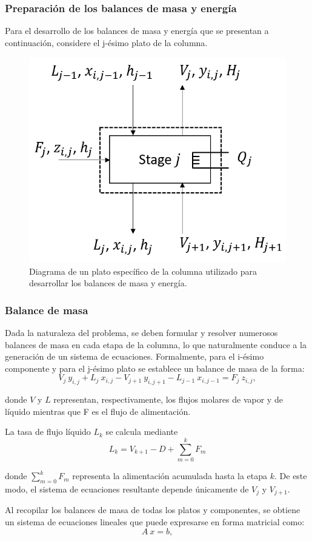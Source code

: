 \newpage
\subsubsection{Preparación de los balances de masa y energía}
Para el desarrollo de los balances de masa y energía que se presentan a continuación, considere el j-ésimo plato de la columna.

\begin{figure}[ht]
    \centering
    \includegraphics[width=0.5\linewidth]{../resources/flowcharts/balances_plato.png}
    \caption{Diagrama de un plato específico de la columna utilizado para desarrollar los balances de masa y energía.}
\end{figure}

\subsubsection{Balance de masa}
Dada la naturaleza del problema, se deben formular y resolver numerosos balances de masa en cada etapa de la columna, lo que naturalmente conduce a la generación de un sistema de ecuaciones. Formalmente, para el i-ésimo componente y para el j-ésimo plato se establece un balance de masa de la forma:
$$
    V_{j}\ y_{i,j} + L_{j}\ x_{i,j} - V_{j+1}\ y_{i,j+1} - L_{j-1}\ x_{i,j-1} = F_{j}\ z_{i,j},
$$

donde $V$ y $L$ representan, respectivamente, los flujos molares de vapor y de líquido mientras que F es el flujo de alimentación.

La tasa de flujo líquido $L_k$ se calcula mediante
$$
    L_k = V_{k+1} - D + \sum_{m=0}^{k}F_m
$$

donde $\sum_{m=0}^{k}F_m$ representa la alimentación acumulada hasta la etapa $k$. De este modo, el sistema de ecuaciones resultante depende únicamente de $V_j$ y $V_{j+1}$.

Al recopilar los balances de masa de todas los platos y componentes, se obtiene un sistema de ecuaciones lineales que puede expresarse en forma matricial como:
$$
    A\ x = b,
$$

